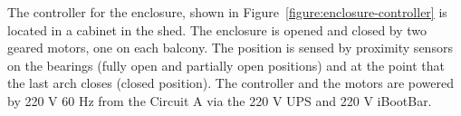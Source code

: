 The controller for the enclosure, shown in Figure~\ref{figure:enclosure-controller} is located in a cabinet in the shed. The enclosure is opened and closed by two geared motors, one on each balcony. The position is sensed by proximity sensors on the bearings (fully open and partially open positions) and at the point that the last arch closes (closed position). The controller and the motors are powered by 220 V 60 Hz from the Circuit A via the 220 V UPS and 220 V iBootBar.

\begin{figure}
\begin{center}
\end{center}
\end{figure}
